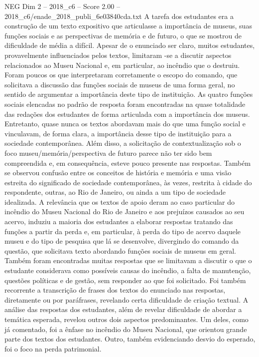 \begin{textsample}{NEG Dim 2 – 2018\_c6 – Score 2.00 – 2018\_c6/enade\_2018\_publi\_6e03840cda.txt}
A tarefa dos estudantes era a construção de um texto expositivo que articulasse a importância de museus, suas funções sociais e as perspectivas de memória e de futuro, o que se mostrou de dificuldade de média a difícil.
Apesar de o enunciado ser claro, muitos estudantes, provavelmente influenciados pelos textos, limitaram -se a discutir aspectos relacionados ao Museu Nacional e, em particular, ao incêndio que o destruiu.
Foram poucos os que interpretaram corretamente o escopo do comando, que solicitava a discussão das funções sociais de museus de uma forma geral, no sentido de argumentar a importância deste tipo de instituição.
As quatro funções sociais elencadas no padrão de resposta foram encontradas na quase totalidade das redações dos estudantes de forma articulada com a importância dos museus.
Entretanto, quase nunca os textos abordavam mais do que uma função social e vinculavam, de forma clara, a importância desse tipo de instituição para a sociedade contemporânea.
Além disso, a solicitação de contextualização sob o foco museu/memória/perspectiva de futuro parece não ter sido bem compreendida e, em consequência, esteve pouco presente nas respostas.
Também se observou confusão entre os conceitos de história e memória e uma visão estreita do significado de sociedade contemporânea, às vezes, restrita à cidade do respondente, outras, ao Rio de Janeiro, ou ainda a um tipo de sociedade idealizada.
A relevância que os textos de apoio deram ao caso particular do incêndio do Museu Nacional do Rio de Janeiro e aos prejuízos causados ao seu acervo, induziu a maioria dos estudantes a elaborar respostas tratando das funções a partir da perda e, em particular, à perda do tipo de acervo daquele museu e do tipo de pesquisa que lá se desenvolve, divergindo do comando da questão, que solicitava texto abordando funções sociais de museus em geral.
Também foram encontradas muitas respostas que se limitavam a discutir o que o estudante considerava como possíveis causas do incêndio, a falta de manutenção, questões políticas e de gestão, sem responder ao que foi solicitado.
Foi também recorrente a transcrição de frases dos textos do enunciado nas respostas, diretamente ou por paráfrases, revelando certa dificuldade de criação textual.
A análise das respostas dos estudantes, além de revelar dificuldade de abordar a temática esperada, revelou outros dois aspectos predominantes.
Um deles, como já comentado, foi a ênfase no incêndio do Museu Nacional, que orientou grande parte dos textos dos estudantes.
Outro, também evidenciando desvio do esperado, foi o foco na perda patrimonial.

\end{textsample}
